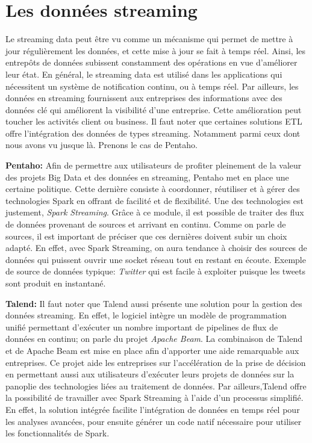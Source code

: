 \documentclass[12pt,a4wide,twoside]{report}
\begin{document}
 \section{Les données streaming}
 Le streaming data peut être vu comme un mécanisme qui permet de mettre à jour régulièrement les données, et cette mise à jour se fait à temps réel.\newline 
 Ainsi, les entrepôts de données subissent constamment des opérations en vue d'améliorer leur état. En général, le streaming data est utilisé dans les applications qui nécessitent un système de notification continu, ou à temps réel.\newline
Par ailleurs, les données en streaming fournissent aux entreprises des informations avec des données clé qui améliorent la visibilité d'une entreprise. Cette amélioration peut toucher les activités client ou business.\newline
Il faut noter que certaines solutions ETL offre l'intégration des données de types streaming. Notamment parmi ceux dont nous avons vu jusque là. Prenons le cas de Pentaho.


\textbf{Pentaho: }
Afin de permettre aux utilisateurs de profiter pleinement de la valeur des projets Big Data et des données en streaming, Pentaho met en place une certaine politique. Cette dernière consiste à coordonner, réutiliser et à gérer des technologies Spark en offrant de facilité et de flexibilité. Une des technologies est justement, \emph{Spark Streaming}. Grâce à ce module, il est possible de traiter des flux de données provenant de sources et arrivant en continu. \newline
Comme on parle de sources, il est important de préciser que ces dernières doivent subir un choix adapté. En effet, avec Spark Streaming, on aura tendance à choisir des sources de données qui puissent ouvrir une socket réseau tout en restant en écoute.\newline 
Exemple de source de données typique: \emph{Twitter} qui est facile à exploiter puisque les tweets sont produit en instantané.


\textbf{Talend: }
Il faut noter que Talend aussi présente une solution pour la gestion des données streaming. En effet, le logiciel intègre un modèle de programmation unifié permettant d'exécuter un nombre important de pipelines de flux de données en continu; on parle du projet \emph{Apache Beam}.\newline
La combinaison de Talend et de Apache Beam est mise en place afin d'apporter une aide remarquable aux entreprises. Ce projet aide les entreprises sur l'accélération de la prise de décision en permettant aussi aux utilisateurs d'exécuter leurs projets de données sur la panoplie des technologies liées au traitement de données.\newline
Par ailleurs,Talend offre la possibilité de travailler avec Spark Streaming à l'aide d'un processus simplifié. En effet, la solution intégrée facilite l'intégration de données en temps réel pour les analyses avancées, pour ensuite générer un code natif nécessaire pour utiliser les fonctionnalités de Spark.
\end{document}
